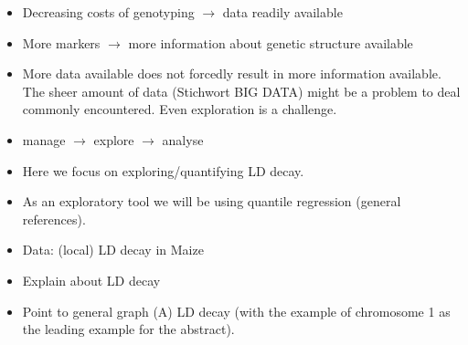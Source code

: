 \documentclass[twoside]{report}
\begin{document}
\begin{itemize}
\item Decreasing costs of genotyping $\rightarrow$ data readily available 
\item More markers $\rightarrow$ more information about genetic structure available
\item More data available does not forcedly result in more information available. The sheer 
	amount of data 
	(Stichwort BIG DATA) might be a problem to deal commonly encountered. Even exploration is 
	a challenge.
\item manage $\rightarrow$ explore $\rightarrow$ analyse
\item Here we focus on exploring/quantifying LD decay.
\item As an exploratory tool we will be using quantile regression (general references).
\item Data: (local) LD decay in Maize
\item Explain about LD decay
\item Point to general graph (A) LD decay (with the example of chromosome 1 as the leading example for 
	the abstract).
\end{itemize}
\end{document}
